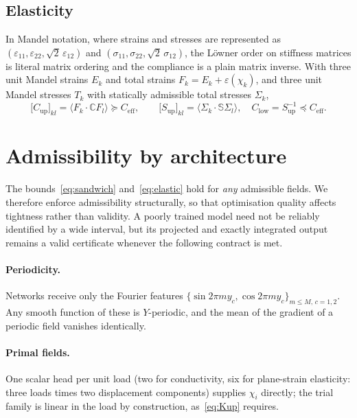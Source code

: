 \subsection{Elasticity}

In Mandel notation, where strains and stresses are represented as
$(\varepsilon_{11}, \varepsilon_{22}, \sqrt{2}\,\varepsilon_{12})$ and
$(\sigma_{11}, \sigma_{22}, \sqrt{2}\,\sigma_{12})$, the L\"owner order on
stiffness matrices is literal matrix ordering and the compliance is a plain
matrix inverse. With three unit Mandel strains $E_k$ and total strains
$F_k = E_k + \varepsilon(\chi_k)$, and three unit Mandel stresses $T_k$
with statically admissible total stresses $\Sigma_k$,
%
\begin{equation}
  \big[C_{\mathrm{up}}\big]_{kl} = \langle F_k \cdot \mathbb{C} F_l \rangle
  \succeq C_{\mathrm{eff}}, \qquad
  \big[S_{\mathrm{up}}\big]_{kl} = \langle \Sigma_k \cdot \mathbb{S} \Sigma_l \rangle,
  \quad C_{\mathrm{low}} = S_{\mathrm{up}}^{-1} \preceq C_{\mathrm{eff}} .
  \label{eq:elastic}
\end{equation}

\section{Admissibility by architecture}
\label{sec:admissible}

The bounds~\eqref{eq:sandwich} and~\eqref{eq:elastic} hold for
\emph{any} admissible fields. We therefore enforce admissibility
structurally, so that optimisation quality affects tightness rather than
validity. A poorly trained model need not be reliably identified by a wide
interval, but its projected and exactly integrated output remains a valid
certificate whenever the following contract is met.

\paragraph{Periodicity.} Networks receive only the Fourier features
$\{\sin 2\pi m y_c, \cos 2\pi m y_c\}_{m \le M,\, c=1,2}$. Any smooth
function of these is $Y$-periodic, and the mean of the gradient of a
periodic field vanishes identically.

\paragraph{Primal fields.} One scalar head per unit load (two for
conductivity, six for plane-strain elasticity: three loads times two
displacement components) supplies $\chi_i$ directly; the trial family is
linear in the load by construction, as~\eqref{eq:Kup} requires.

